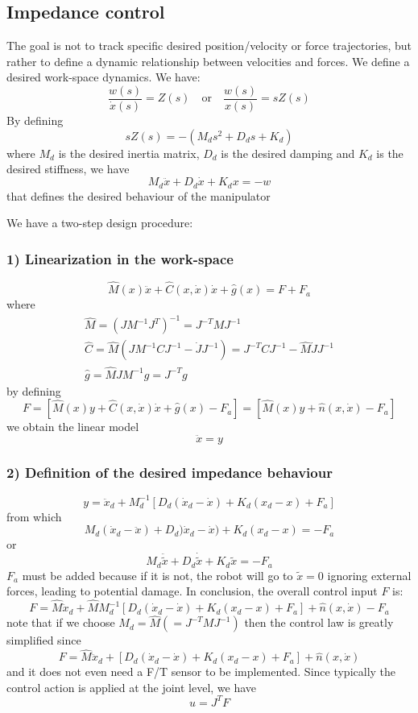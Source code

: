 \documentclass{book}
\begin{document}
\subsection{Impedance control}
The goal is not to track specific desired position/velocity or force trajectories, but rather to define a dynamic relationship between velocities and forces. We define a desired work-space dynamics. We have:
\[
    \displaystyle\frac{w(s)}{\dot{x}(s)}=Z(s) \quad \text{or} \quad \displaystyle\frac{w(s)}{x(s)}=sZ(s)
\]
By defining
\[
    sZ(s)=-(M_ds^2+D_ds+K_d)
\]
where $M_d$ is the desired inertia matrix, $D_d$ is the desired damping and $K_d$ is the desired stiffness, we have
\[
    M_d\ddot{x}+D_d\dot{x}+K_dx=-w
\]
that defines the desired behaviour of the manipulator

We have a two-step design procedure:
\subsubsection{1) Linearization in the work-space}
\[
    \hat{M}(x)\ddot{x}+\hat{C}(x,\dot{x})\dot{x}+\hat{g}(x)=F+F_a
\]
where
\begin{gather*}
    \hat{M} = (JM^{-1}J^T)^{-1}=J^{-T}MJ^{-1}\\
    \hat{C} = \hat{M}(JM^{-1}CJ^{-1}-\dot{J}J^{-1})=J^{-T}CJ^{-1}-\hat{M}\dot{J}J^{-1}\\
    \hat{g} = \hat{M}JM^{-1}g = J^{-T}g
\end{gather*}
by defining 
\[
    F = [\hat{M}(x)y+\hat{C}(x,\dot{x})\dot{x}+\hat{g}(x)-F_a] = [\hat{M}(x)y+\hat{n}(x,\dot{x})-F_a]
\]
we obtain the linear model 
\[
    \ddot{x}=y
\]
\subsubsection{2) Definition of the desired impedance behaviour}
\[
    y=\ddot{x}_d+M_d^{-1}[D_d(\dot{x}_d-\dot{x})+K_d(x_d-x)+F_a]
\]
from which
\[
    M_d(\dot{x}_d-\ddot{x})+D_d)\dot{x}_d-\dot{x})+K_d(x_d-x)=-F_a
\]
or 
\[
    M_d\ddot{\tilde{x}}+D_d\dot{\tilde{x}}+K_d\tilde{x}=-F_a
\]
$F_a$ must be added because if it is not, the robot will go to $\tilde{x}=0$ ignoring external forces, leading to potential damage.
In conclusion, the overall control input $F$ is:
\[
    F = \hat{M}\ddot{x}_d +\hat{M}M_d^{-1}[D_d(\dot{x}_d-\dot{x})+K_d(x_d-x)+F_a]+\hat{n}(x,\dot{x})-F_a
\]
note that if we choose $M_d=\hat{M} (=J^{-T}MJ^{-1})$ then the control law is greatly simplified since 
\[
    F = \hat{M}\ddot{x}_d+[D_d(\dot{x}_d-\dot{x})+K_d(x_d-x)+F_a]+\hat{n}(x,\dot{x})
\]
and it does not even need a F/T sensor to be implemented. Since typically the control action is applied at the joint level, we have 
\[
    u=J^TF
\]
\end{document}
